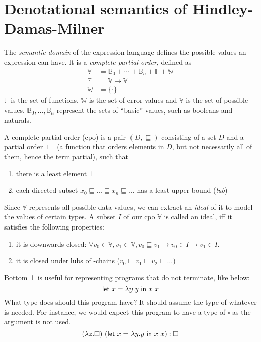 \appendix
\chapter{Denotational semantics of Hindley-Damas-Milner}\label{sec:denot-semant-hindl} 

The \emph{semantic domain} of the expression language defines the
possible values an expression can have. It is a \emph{complete partial
  order}, defined as
\begin{align*}
  \mathbb{V} &= \mathbb{B}_0 + \cdots + \mathbb{B}_n + \mathbb{F} + \mathbb{W} \\
  \mathbb{F} &= \mathbb{V} \rightarrow \mathbb{V} \\
  \mathbb{W} &= \{ \cdot \}
\end{align*}
$\mathbb{F}$ is the set of functions, $\mathbb{W}$ is the set of error
values and $\mathbb{V}$ is the set of possible values.
$\mathbb{B}_0 , \ldots , \mathbb{B}_n$ represent the sets of
``basic'' values, such as booleans and naturals.

A complete partial order (cpo) is a pair $(D, \sqsubseteq)$ consisting of a set
$D$ and a partial order $\sqsubseteq$ (a function that orders elements in
$D$, but not necessarily all of them, hence the term partial), such
that
\begin{enumerate}
\item there is a least element $\bot$
\item each directed subset $x_0 \sqsubseteq \ldots \sqsubseteq x_n \sqsubseteq \ldots$ has a least upper bound
  (\emph{lub})
\end{enumerate}

Since $\mathbb{V}$ represents all possible data values, we
can extract an \emph{ideal} of it to model the values of certain
types. A subset $I$ of our cpo $\mathbb{V}$ is called an ideal, iff it
satisfies the following properties:
\begin{enumerate}
\item it is downwards closed: $\forall v_0 \in \mathbb{V}, v_1 \in \mathbb{V}, v_0 \sqsubseteq v_1 \rightarrow
  v_0 \in I \rightarrow v_1 \in I$.
\item it is closed under lubs of \omega-chains ($v_0 \sqsubseteq v_1 \sqsubseteq v_2 \sqsubseteq \ldots$)
\end{enumerate}

Bottom $\bot$ is useful for representing programs that do not terminate,
like below:
\[\mathsf{let} \ x = \lambda y. y \ \mathsf{in} \ x \ x\]
What type does should this program have? It should assume the
type of whatever is needed. For instance, we would expect this program
to have a type of $\square$ as the argument is not used.
\[ (\lambda z. \square) \ (\mathsf{let} \ x = \lambda y. y \ \mathsf{in} \ x \ x) : \square \]


